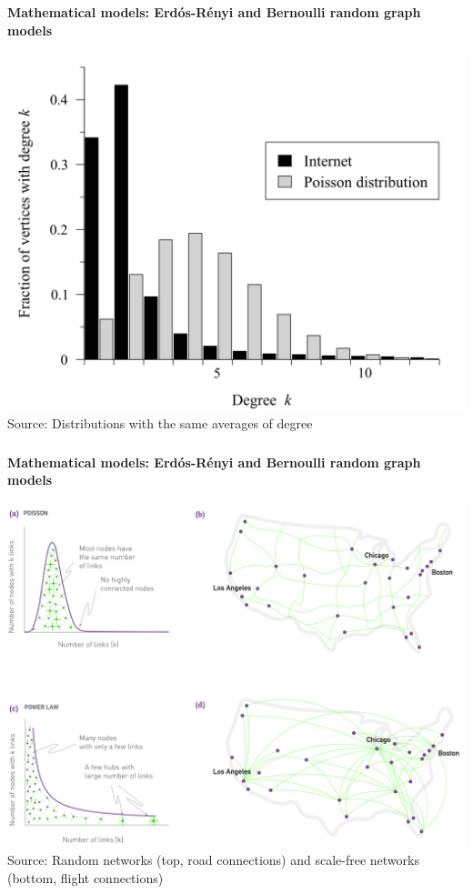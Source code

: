 \documentclass[8pt]{beamer}
\begin{document}

\begin{frame}
\frametitle{\insertsection}
\framesubtitle{Mathematical models: Erd\'os-R\'enyi and Bernoulli random graph models}

\centering
\includegraphics[height=0.8\textheight]{newman}\\
\tiny{Source: Distributions with the same averages of degree \cite{Newman2010}}

\end{frame}


\begin{frame}
\frametitle{\insertsection}
\framesubtitle{Mathematical models: Erd\'os-R\'enyi and Bernoulli random graph models}

\centering
\includegraphics[height=0.8\textheight]{scale_free2}\\
\tiny{Source: Random networks (top, road connections) and scale-free networks (bottom, flight connections) \cite{Barabasi2016}}

\end{frame}
\end{document}
